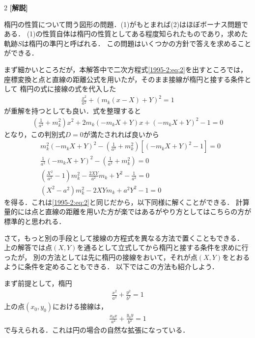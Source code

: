 \documentclass[../../main.tex]{subfiles}
\begin{document}
\begin{multicols}{2}
  \vspace{10pt}
  {\bf[解説]}

  楕円の性質について問う図形の問題．(1)がもとまれば(2)はほぼボーナス問題である．
  (1)の性質自体は楕円の性質としてある程度知られたものであり，求めた軌跡$S$は楕円の準円と呼ばれる．
  この問題はいくつかの方針で答えを求めることができる．

  まず細かいところだが，本解答中で二次方程式\cref{1995-2:eq:2}を出すところでは，座標変換と点と直線の距離公式を用いたが，そのまま接線が楕円と接する条件として
  楕円の式に接線の式を代入した
  \begin{align*}
    \frac{x^2}{a^2}+\left(m_k(x-X)+Y\right)^2 = 1
  \end{align*}
  が重解を持つとしても良い．式を整理すると
  \begin{align*}
    \left(\frac{1}{a^2}+m_k^2\right)x^2 + 2m_k\left(-m_kX+Y\right)x +\left(-m_kX+Y\right)^2 -1 = 0
  \end{align*}
  となり，この判別式$D=0$が満たされれば良いから
  \begin{align*}
     & m_k^2\left(-m_kX+Y\right)^2 - \left(\frac{1}{a^2}+m_k^2\right)\left[\left(-m_kX+Y\right)^2 -1\right] = 0 \\
     & \frac{1}{a^2}\left(-m_kX+Y\right)^2 -\left(\frac{1}{a^2}+m_k^2\right) = 0                                \\
     & \left(\frac{X^2}{a^2}-1\right)m_k^2 - \frac{2XY}{a^2}m_k + Y^2 -\frac{1}{a^2} = 0                        \\
     & \left(X^2-a^2\right)m_k^2 - 2XYm_k + a^2Y^2 - 1= 0
  \end{align*}
  を得る．これは\cref{1995-2:eq:2}と同じだから，以下同様に解くことができる．
  計算量的には点と直線の距離を用いた方が楽ではあるがやり方としてはこちらの方が標準的と思われる．

  さて，もっと別の手段として接線の方程式を異なる方法で置くこともできる．
  上の解答では点$(X,Y)$を通るとして立式してから楕円と接する条件を求めに行ったが，
  別の方法としては先に楕円の接線をおいて，それが点$(X,Y)$をとおるように条件を定めることもできる．
  以下ではこの方法も紹介しよう．

  まず前提として，楕円
  \begin{align*}
    \frac{x^2}{a^2}+\frac{y^2}{b^2} = 1
  \end{align*}
  上の点$(x_0,y_0)$における接線は，
  \begin{align*}
    \frac{x_0 x}{a^2}+\frac{y_0 y}{b^2} = 1
  \end{align*}
  で与えられる．これは円の場合の自然な拡張になっている．


\end{multicols}
\end{document}
